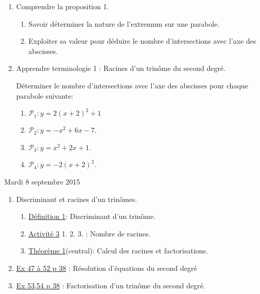 \documentclass[a4paper,11pt]{article}
\theoremstyle{break}
\begin{document}
  \begin{Dev*}
    
    \begin{enumerate}
      
      \item Comprendre la proposition 1.
      \begin{enumerate}
	\item Savoir déterminer la nature de l'extremum sur une parabole.
	\item Exploiter sa valeur pour déduire le nombre d'intersections 
	avec l'axe des abscisses.
	
      \end{enumerate}
      \item Apprendre terminologie 1 : Racines d'un trinôme du second degré.
      \vspace{0.5cm}
      
      \begin{dm}
	
	Déterminer le nombre d'intersections avec l'axe des abscisses pour chaque parabole
	suivante:
	\begin{enumerate}
	  \item $\mathcal{P}_1:y=2(x+2)^2+1$
	  \item $\mathcal{P}_2:y=-x^2+6x-7$.%
	  \item $\mathcal{P}_3:y=x^2+2x+1$.
	  \item $\mathcal{P}_4:y=-2(x+2)^2$.
	\end{enumerate} 
      \end{dm}
      
      
      
    \end{enumerate}
  \end{Dev*}
  
  
  Mardi 8 septembre 2015
   \begin{enumerate}   
    \item Discriminant et racines d'un trinômes.
    \begin{enumerate}
      \item 
      \href{https://github.com/mathlorgues/math1sd1516/blob/master/20150908/definitions.pdf}
   {Définition 1}: Discriminant d'un trinôme.
      \item 
      \href{https://github.com/mathlorgues/math1sd1516/blob/master/20150908/activite.pdf}
   {Activité 3} 1. 2. 3. : Nombre de racines.
      \item 
      \href{https://github.com/mathlorgues/math1sd1516/blob/master/20150908/propositions.pdf}
   {Théorème 1}(central): Calcul des racines et factorisations.
    \end{enumerate}
    \item  
    \href{https://github.com/mathlorgues/math1sd1516/blob/master/images/47-52p38.png}
   {Ex 47 à 52 p 38} : 
    Résolution d'équations du second degré
    \item 
    \href{https://github.com/mathlorgues/math1sd1516/blob/master/images/53-54%20p38.png}
   {Ex 53,54 p 38} : 
    Factorisation d'un trinôme du second degré.
  \end{enumerate}
  
\end{document}
